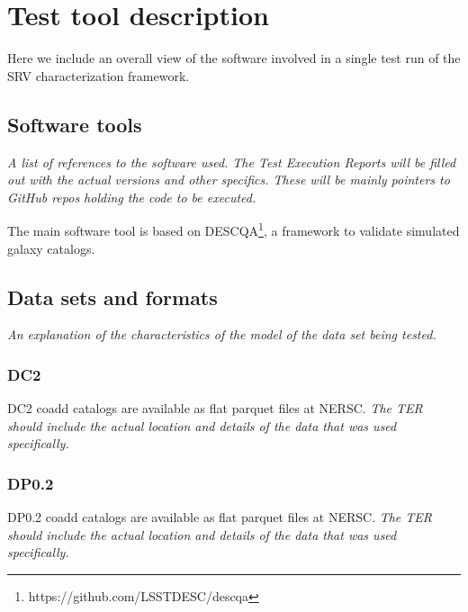 \documentclass[12pt, a4paper]{article}
\begin{document}

\section{Test tool description}

Here we include an overall view of the software involved in a single test run of the SRV characterization framework.

\subsection{Software tools}

\textit{A list of references to the software used. The Test Execution Reports will be filled out with the actual versions and other specifics. These will be mainly pointers to GitHub repos holding the code to be executed.}

The main software tool is based on DESCQA\footnote{https://github.com/LSSTDESC/descqa}, a framework to validate simulated galaxy catalogs.

\subsection{Data sets and formats}

\textit{An explanation of the characteristics of the model of the data set being tested.}

\subsubsection{DC2}

DC2 coadd catalogs are available as flat parquet files at NERSC. \textit{The TER should include the actual location and details of the data that was used specifically.}

\subsubsection{DP0.2}

DP0.2 coadd catalogs are available as flat parquet files at NERSC. \textit{The TER should include the actual location and details of the data that was used specifically.}

\end{document}
